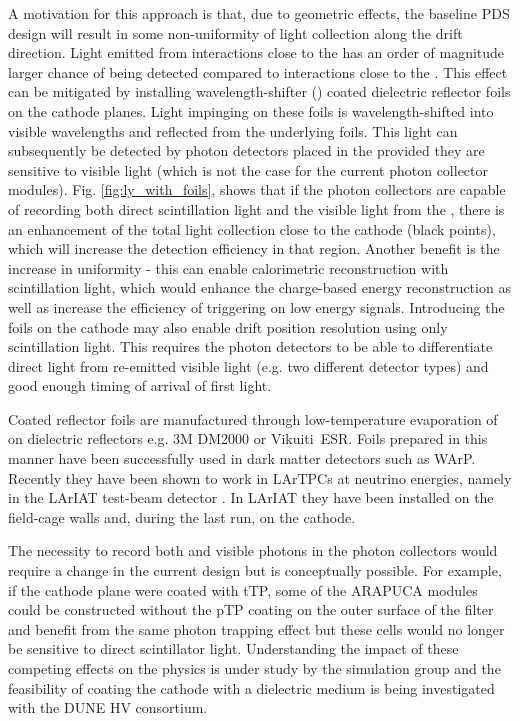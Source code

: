 A motivation for this approach is that, due to geometric effects, the baseline PDS design will result in some non-uniformity of light collection along the drift direction. Light emitted from interactions close to the  has an order of magnitude larger chance of being detected compared to interactions close to the . This effect can be mitigated by installing wavelength-shifter () coated dielectric reflector foils on the cathode planes.
Light impinging on these foils is wavelength-shifted into visible wavelengths and reflected from the underlying foils. This light can subsequently be detected by photon detectors placed in the  provided they are sensitive to visible light (which is not the case for the current photon collector modules). Fig. \ref{fig:ly_with_foils}, shows that if the  photon collectors are capable of recording both direct scintillation light and the visible light from the , there is an enhancement of the total light collection close to the cathode (black points), which will increase the detection efficiency in that region. 
Another benefit is the increase in uniformity - this can enable calorimetric reconstruction with scintillation light, which would enhance the charge-based energy reconstruction as well as increase the efficiency of triggering on low energy signals. Introducing the foils on the cathode may also enable drift position resolution  using only scintillation light. This requires the photon detectors to be able to differentiate direct  light from re-emitted visible light (e.g. two different  detector types) and good enough timing of arrival of first light.

Coated reflector foils are manufactured through low-temperature evaporation of  on dielectric reflectors e.g. 3M DM2000 or Vikuiti\texttrademark\  ESR. Foils prepared in this manner have been successfully used in dark matter detectors such as WArP\cite{Acciarri:2008kv}. Recently they have been shown to work in LArTPCs at neutrino energies, namely  in the LArIAT test-beam detector \cite{Garcia-Gamez:2017cmu}. In LArIAT they have been installed on the field-cage walls and, during the last run, on the cathode.  

The necessity to record both  and visible photons in the photon collectors would require a change in the current design but is conceptually possible. For example, if the cathode plane were coated with tTP,  some of the ARAPUCA modules could be constructed without the pTP coating on the outer surface of the filter and benefit from the same photon trapping effect but these cells would no longer be sensitive to direct scintillator light.   
Understanding the impact of these competing effects on the physics is under study by the simulation group and the feasibility of coating the cathode with a dielectric medium is being investigated with the DUNE HV consortium.

